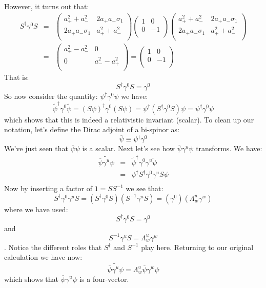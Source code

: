 \documentclass[12pt]{book}
\begin{document}
However, it turns out that:
\begin{eqnarray*}
S^\dagger \gamma^0 S &=& 
\begin{pmatrix}
a_+^2+a_-^2        & 2 a_+ a_- \sigma_1 \\
2 a_+ a_- \sigma_1 & a_+^2+a_-^2 \\
\end{pmatrix}
\begin{pmatrix}
1        & 0 \\
0        & -1 \\
\end{pmatrix}
\begin{pmatrix}
a_+^2+a_-^2        & 2 a_+ a_- \sigma_1 \\
2 a_+ a_- \sigma_1 & a_+^2+a_-^2 \\
\end{pmatrix}\\[3pt]
&=& \begin{pmatrix}
a_+^2-a_-^2        & 0 \\
0                  & a_-^2-a_+^2 \\
\end{pmatrix}
= \begin{pmatrix}
1        & 0 \\
0        & -1 \\
\end{pmatrix}
\end{eqnarray*}
That is:
$$S^\dagger \gamma^0 S = \gamma^0$$
So now consider the quantity:
$\psi^\dagger \gamma^0 \psi$
we have:
$$\widetilde{\psi}^\dagger \gamma^0 \widetilde{\psi}
= (S \psi)^\dagger \gamma^0 (S \psi) 
= \psi^\dagger (S^\dagger \gamma^0 S) \psi
= \psi^\dagger \gamma^0 \psi
$$
which shows that this is indeed a relativistic invariant (scalar).  To clean up our notation, let's define the Dirac adjoint of a bi-spinor as:
$$\overline{\psi} \equiv \psi^\dagger \gamma^0 $$
We've just seen that $\overline{\psi} \psi$ is a scalar.  Next let's see how $\overline{\psi} \gamma^u \psi$ transforms.  We have:
\begin{eqnarray*}
\widetilde{\overline{\psi} \gamma^u \psi} &=& 
\widetilde{\psi}^\dagger \gamma^0 \gamma^u \widetilde{\psi} \\
&=& \psi^\dagger S^\dagger \gamma^0 \gamma^u S \psi \\
\end{eqnarray*}
Now by inserting a factor of $1 = S S^{-1}$ we see that:
$$S^\dagger \gamma^0 \gamma^u S = (S^\dagger \gamma^0 S) (S^{-1}\gamma^u S)
= (\gamma^0) (\Lambda^u_w \gamma^w)$$
where we have used:
$$S^\dagger \gamma^0 S = \gamma^0$$
and
$$S^{-1} \gamma^u S = \Lambda^u_w \gamma^w$$.
Notice the different roles that $S^\dagger$ and $S^{-1}$ play here.  Returning to our original calculation we have now:
$$\widetilde{\overline{\psi} \gamma^u \psi} = \Lambda^u_w \overline{\psi} \gamma^w \psi$$
which shows that $\overline{\psi} \gamma^u \psi$ is a four-vector.
\end{document}
